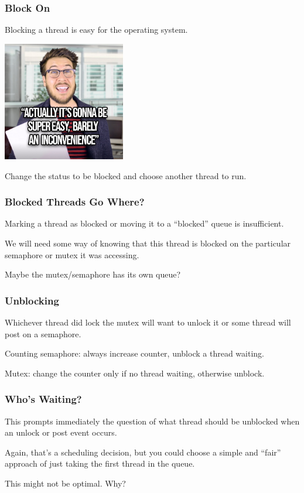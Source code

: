 \begin{frame}
\frametitle{Block On}

Blocking a thread is easy for the operating system.

\begin{center}
	\includegraphics[width=0.4\textwidth]{images/supereasy.jpg}
\end{center}

Change the status to be blocked and choose another thread to run.

\end{frame}

\begin{frame}
\frametitle{Blocked Threads Go Where?}

Marking a thread as blocked or moving it to a ``blocked'' queue is insufficient.

We will need some way of knowing that this thread is blocked on the particular semaphore or mutex it was accessing.

Maybe the mutex/semaphore has its own queue?

\end{frame}

\begin{frame}
\frametitle{Unblocking}

Whichever thread did lock the mutex will want to unlock it or some thread will post on a semaphore.

Counting semaphore: always increase counter, unblock a thread waiting.

Mutex: change the counter only if no thread waiting, otherwise unblock.

\end{frame}

\begin{frame}
\frametitle{Who's Waiting?}

This prompts immediately the question of what thread should be unblocked when an unlock or post event occurs. 

Again, that's a scheduling decision, but you could choose a simple and ``fair'' approach of just taking the first thread in the queue. 

This might not be optimal. Why?

\end{frame}

